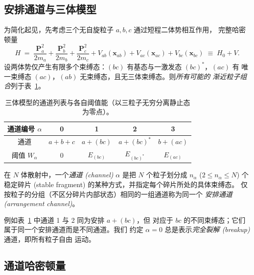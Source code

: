 \subsection{安排通道与三体模型}

为简化起见，先考虑三个无自旋粒子 $a,b,c$ 通过短程二体势相互作用，
完整哈密顿量
\begin{equation}
  H \;=\; \frac{\mathbf{P}_a^2}{2m_a} + \frac{\mathbf{P}_b^2}{2m_b}
        + \frac{\mathbf{P}_c^2}{2m_c}
       + V_{ab}(\mathbf{x}_{ab}) + V_{ac}(\mathbf{x}_{ac}) + V_{bc}(\mathbf{x}_{bc})
       \;\equiv\; H_0 + V .
  \label{eq:multich-Hfull}
\end{equation}
设两体势仅产生有限多个束缚态：$(bc)$ 有基态与一激发态 $(bc)^*$，$(ac)$ 有
唯一束缚态 $(ac)$，$(ab)$ 无束缚态，且无三体束缚态。则\emph{所有可能的
渐近粒子组合}列于表~\ref{tab:multich-channels}。
\begin{table}[h]
  \centering
  \begin{tabular}{c|cccc}
    \hline
    通道编号 $\alpha$ & 0 & 1 & 2 & 3\\
    \hline
    通道  & $a+b+c$ & $a+(bc)$ & $a+(bc)^*$ & $b+(ac)$\\
    阈值 $W_\alpha$ & $0$ & $E_{(bc)}$ & $E_{(bc)^*}$ & $E_{(ac)}$\\
    \hline
  \end{tabular}
  \caption{三体模型的通道列表与各自阈值能（以三粒子无穷分离静止态为零点）。}
  \label{tab:multich-channels}
\end{table}

\begin{definition}[通道与安排通道]\label{def:multich-channel}
  在 $N$ 体散射中，一个\emph{通道 (channel)} $\alpha$ 是把
  $N$ 个粒子划分成 $n_\alpha$ ($2\le n_\alpha\le N$) 个稳定碎片
  (stable fragment) 的某种方式，并指定每个碎片所处的具体束缚态。
  仅按粒子的分组（不区分碎片内部状态）相同的一组通道称为同一个
  \emph{安排通道 (arrangement channel)}。
\end{definition}

例如表~\ref{tab:multich-channels} 中通道 1 与 2 同为安排 $a+(bc)$，但
对应于 $bc$ 的不同束缚态；它们属于同一个安排通道而是不同通道。我们
约定 $\alpha=0$ 总是表示\emph{完全裂解 (breakup)} 通道，即所有粒子自由
运动。

\subsection{通道哈密顿量}

